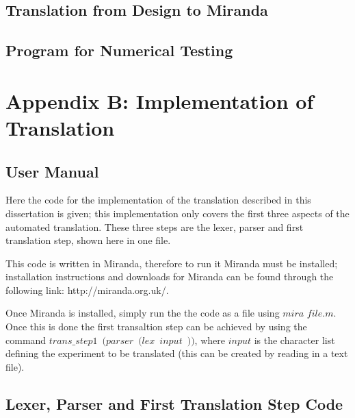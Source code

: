 \documentclass{article}
\begin{document}
\subsection*{Translation from Design to Miranda}





\subsection*{Program for Numerical Testing}






\newpage
\section*{Appendix B: Implementation of Translation}

\subsection*{User Manual}
Here the code for the implementation of the translation described in this dissertation is given; this implementation only covers the first three aspects of the automated translation. These three steps are the lexer, parser and first translation step, shown here in one file. 

This code is written in Miranda, therefore to run it Miranda must be installed; installation instructions and downloads for Miranda can be found through the following link: http://miranda.org.uk/. 

Once Miranda is installed, simply run the the code as a file using $mira$ $file.m$. Once this is done the first transaltion step can be achieved by using the command $trans\_step1$~$(parser$~$(lex$~$input$~$))$, where $input$ is the character list defining the experiment to be translated (this can be created by reading in a text file). 


\subsection*{Lexer, Parser and First Translation Step Code}


\newpage
{}









     
\end{document}
